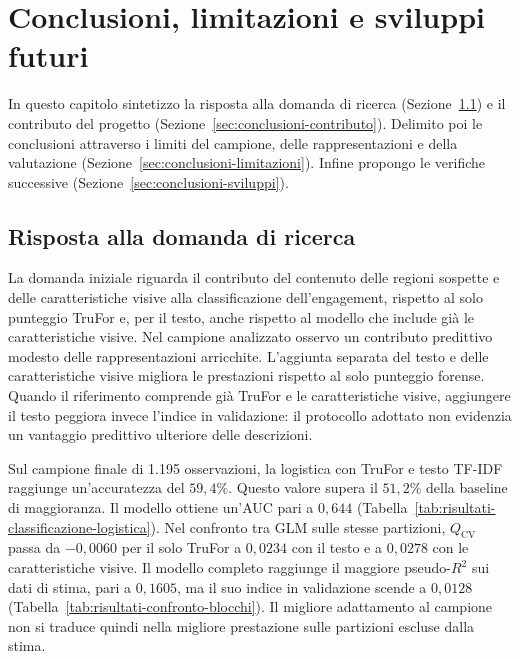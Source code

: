 
\chapter{Conclusioni, limitazioni e sviluppi futuri}
\label{chap:conclusioni-limitazioni-sviluppi}

In questo capitolo sintetizzo la risposta alla domanda di ricerca (Sezione~\ref{sec:conclusioni-risposta}) e il contributo del progetto (Sezione~\ref{sec:conclusioni-contributo}). Delimito poi le conclusioni attraverso i limiti del campione, delle rappresentazioni e della valutazione (Sezione~\ref{sec:conclusioni-limitazioni}). Infine propongo le verifiche successive (Sezione~\ref{sec:conclusioni-sviluppi}).

\section{Risposta alla domanda di ricerca}
\label{sec:conclusioni-risposta}

La domanda iniziale riguarda il contributo del contenuto delle regioni sospette e delle caratteristiche visive alla classificazione dell'engagement, rispetto al solo punteggio TruFor e, per il testo, anche rispetto al modello che include già le caratteristiche visive. Nel campione analizzato osservo un contributo predittivo modesto delle rappresentazioni arricchite. L'aggiunta separata del testo e delle caratteristiche visive migliora le prestazioni rispetto al solo punteggio forense. Quando il riferimento comprende già TruFor e le caratteristiche visive, aggiungere il testo peggiora invece l'indice in validazione: il protocollo adottato non evidenzia un vantaggio predittivo ulteriore delle descrizioni.

Sul campione finale di 1.195 osservazioni, la logistica con TruFor e testo TF-IDF raggiunge un'accuratezza del $59{,}4\%$. Questo valore supera il $51{,}2\%$ della baseline di maggioranza. Il modello ottiene un'AUC pari a $0{,}644$ (Tabella~\ref{tab:risultati-classificazione-logistica}). Nel confronto tra GLM sulle stesse partizioni, $Q_{\mathrm{CV}}$ passa da $-0{,}0060$ per il solo TruFor a $0{,}0234$ con il testo e a $0{,}0278$ con le caratteristiche visive. Il modello completo raggiunge il maggiore pseudo-$R^2$ sui dati di stima, pari a $0{,}1605$, ma il suo indice in validazione scende a $0{,}0128$ (Tabella~\ref{tab:risultati-confronto-blocchi}). Il migliore adattamento al campione non si traduce quindi nella migliore prestazione sulle partizioni escluse dalla stima.

